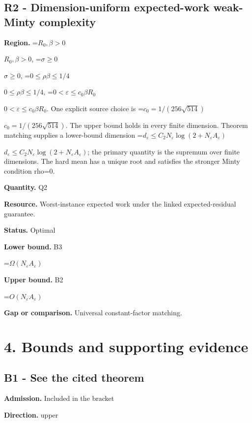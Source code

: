 \documentclass[10pt,a4paper]{article}
\newcommand{\AtlasMath}[1]{\par\begingroup\centering\setbox0=\hbox{$\displaystyle #1$}\ifdim\wd0>1.4\linewidth\typeout{ATLAS WIDE FORMULA: \the\wd0}\fi\ifdim\wd0>\linewidth\resizebox{\linewidth}{!}{\box0}\else\box0\fi\par\endgroup}
\newcommand{\AtlasInlineMath}[1]{\begingroup\setbox0=\hbox{$#1$}\ifdim\wd0>.4\linewidth\endgroup\AtlasMath{#1}\else\endgroup$#1$\fi}
\begin{document}
\subsection{R2 - Dimension-uniform expected-work weak-Minty complexity}


\textbf{Region.} \AtlasInlineMath{R_0,\beta>0}, \AtlasInlineMath{\sigma\ge0}, \AtlasInlineMath{0\le\rho\beta\le1/4}, \AtlasInlineMath{0<\varepsilon\le c_0\beta R_0}. One explicit source choice is \AtlasInlineMath{c_0=1/(256\sqrt{514})}. The upper bound holds in every finite dimension. Theorem matching supplies a lower-bound dimension \AtlasInlineMath{d_\varepsilon\le C_2N_\varepsilon\log(2+N_\varepsilon A_\varepsilon)}; the primary quantity is the supremum over finite dimensions. The hard mean has a unique root and satisfies the stronger Minty condition rho=0.



\textbf{Quantity.} Q2



\textbf{Resource.} Worst-instance expected work under the linked expected-residual guarantee.



\textbf{Status.} Optimal



\textbf{Lower bound.} B3



\AtlasMath{\Omega(N_\varepsilon A_\varepsilon)}


\textbf{Upper bound.} B2



\AtlasMath{O(N_\varepsilon A_\varepsilon)}


\textbf{Gap or comparison.} Universal constant-factor matching.



\section{4. Bounds and supporting evidence}


\subsection{B1 - See the cited theorem}


\textbf{Admission.} Included in the bracket



\textbf{Direction.} upper
\end{document}
